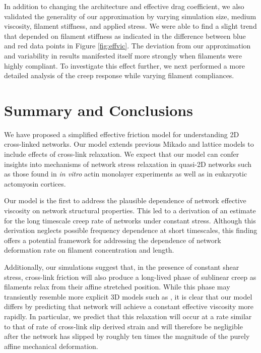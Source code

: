 \documentclass[pre,preprint]{revtex4-1}
\begin{document}
In addition to changing the architecture and effective drag coefficient, we also validated the generality of our approximation by varying simulation size, medium viscosity, filament stiffness, and applied stress.  We were able to find a slight trend that depended on filament stiffness as indicated in the difference between blue and red data points in Figure \ref{fig:effvic}.  The deviation from our approximation and variability in results manifested itself more strongly when filaments were highly compliant.  To investigate this effect further, we next performed a more detailed analysis of the creep response while varying filament compliances.















\section{Summary and Conclusions}
We have proposed a simplified effective friction model for understanding 2D cross-linked networks. Our model extends previous Mikado and lattice models to include effects of cross-link relaxation. We expect that our model can confer insights into mechanisms of network stress relaxation in quasi-2D networks such as those found in \textit{in vitro} actin monolayer experiments\cite{rheo_2D1} as well as in eukaryotic actomyosin cortices\cite{cellmech_flows}.   

Our model is the first to address the plausible dependence of network effective viscosity on network structural properties.  This led to a derivation of an estimate for the long timescale creep rate of networks under constant stress.  Although this derivation neglects possible frequency dependence at short timescales, this finding offers a potential framework for addressing the dependence of network deformation rate on filament concentration and length.

Additionally, our simulations suggest that, in the presence of constant shear stress, cross-link friction will also produce a long-lived phase of sublinear creep as filaments relax from their affine stretched position. While this phase may transiently resemble more explicit 3D models such as \cite{theo_crosslinkslip1}, it is clear that our model differs by predicting that network will achieve a constant effective viscosity more rapidly.  In particular, we predict that this relaxation will occur at a rate similar to that of rate of cross-link slip derived strain and will therefore be negligible after the network has slipped by roughly ten times the magnitude of the purely affine mechanical deformation.  
\end{document}
